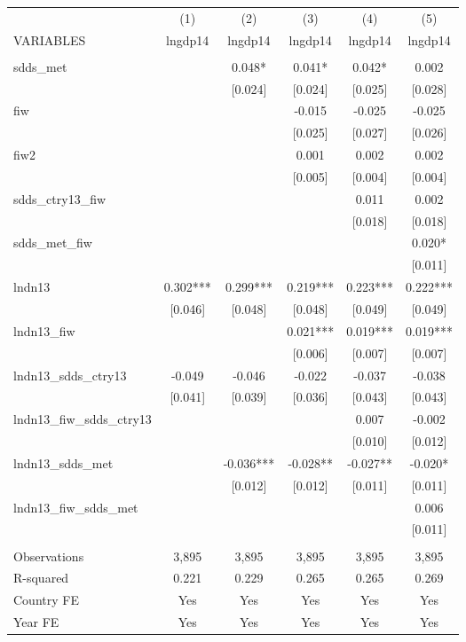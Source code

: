 \begin{tabular}{lccccc} \hline
 & (1) & (2) & (3) & (4) & (5) \\
VARIABLES & lngdp14 & lngdp14 & lngdp14 & lngdp14 & lngdp14 \\ \hline
 &  &  &  &  &  \\
sdds\_met &  & 0.048* & 0.041* & 0.042* & 0.002 \\
 &  & [0.024] & [0.024] & [0.025] & [0.028] \\
fiw &  &  & -0.015 & -0.025 & -0.025 \\
 &  &  & [0.025] & [0.027] & [0.026] \\
fiw2 &  &  & 0.001 & 0.002 & 0.002 \\
 &  &  & [0.005] & [0.004] & [0.004] \\
sdds\_ctry13\_fiw &  &  &  & 0.011 & 0.002 \\
 &  &  &  & [0.018] & [0.018] \\
sdds\_met\_fiw &  &  &  &  & 0.020* \\
 &  &  &  &  & [0.011] \\
lndn13 & 0.302*** & 0.299*** & 0.219*** & 0.223*** & 0.222*** \\
 & [0.046] & [0.048] & [0.048] & [0.049] & [0.049] \\
lndn13\_fiw &  &  & 0.021*** & 0.019*** & 0.019*** \\
 &  &  & [0.006] & [0.007] & [0.007] \\
lndn13\_sdds\_ctry13 & -0.049 & -0.046 & -0.022 & -0.037 & -0.038 \\
 & [0.041] & [0.039] & [0.036] & [0.043] & [0.043] \\
lndn13\_fiw\_sdds\_ctry13 &  &  &  & 0.007 & -0.002 \\
 &  &  &  & [0.010] & [0.012] \\
lndn13\_sdds\_met &  & -0.036*** & -0.028** & -0.027** & -0.020* \\
 &  & [0.012] & [0.012] & [0.011] & [0.011] \\
lndn13\_fiw\_sdds\_met &  &  &  &  & 0.006 \\
 &  &  &  &  & [0.011] \\
 &  &  &  &  &  \\
Observations & 3,895 & 3,895 & 3,895 & 3,895 & 3,895 \\
R-squared & 0.221 & 0.229 & 0.265 & 0.265 & 0.269 \\
Country FE & Yes & Yes & Yes & Yes & Yes \\
Year FE & Yes & Yes & Yes & Yes & Yes \\

\end{tabular}
